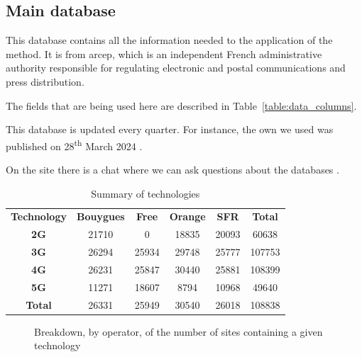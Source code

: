 \documentclass[lettersize,journal,english]{IEEEtran}
\begin{document}
\subsection{Main database}
This database \cite{main_database} contains all the information needed to the application of the method. It is from
\acrfull{arcep}, which is an independent French administrative authority responsible for regulating electronic and postal communications and press distribution.

The fields that are being used here are described in Table~\ref{table:data_columns}.

This database is updated every quarter. For instance, the own we used was published on 28\textsuperscript{th} March 2024 \cite{main_database_hist}.

On the site there is a chat where we can ask questions about the databases \cite{main_database_chat}.

\begin{table}[!b]
    \centering
    \caption{Summary of technologies}
    \label{table:techno_numbers}
    \begin{tabular}{cccccc}
        \toprule
        \textbf{Technology} & \textbf{Bouygues} & \textbf{Free} & \textbf{Orange} & \textbf{SFR} & \textbf{Total} \\
        \cmidrule(lr){1-6}
        \textbf{2G} & 21710 & 0 & 18835 & 20093 & 60638 \\
        \textbf{3G} & 26294 & 25934 & 29748 & 25777 & 107753 \\
        \textbf{4G} & 26231 & 25847 & 30440 & 25881 & 108399 \\
        \textbf{5G} & 11271 & 18607 & 8794 & 10968 & 49640 \\
        \textbf{Total} & 26331 & 25949 & 30540 & 26018 & 108838 \\
        \bottomrule
    \end{tabular}
\end{table}

\begin{figure}[!t]
    \centering
    \caption{Breakdown, by operator, of the number of sites containing a given technology}
    \label{fig:data_technos}
\end{figure}
\end{document}
